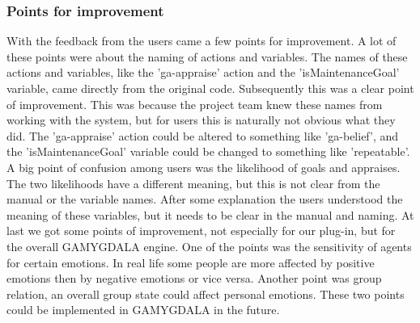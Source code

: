 \subsubsection{Points for improvement}
With the feedback from the users came a few points for improvement. A lot of these points were about the naming of actions and variables. The names of these actions and variables, like the 'ga-appraise' action and the 'isMaintenanceGoal' variable, came directly from the original code. Subsequently this was a clear point of improvement. This was because the project team knew these names from working with the system, but for users this is naturally not obvious what they did. The 'ga-appraise' action could be altered to something like 'ga-belief', and the 'isMaintenanceGoal' variable could be changed to something like 'repeatable'. A big point of confusion among users was the likelihood of goals and appraises. The two likelihoods have a different meaning, but this is not clear from the manual or the variable names. After some explanation the users understood the meaning of these variables, but it needs to be clear in the manual and naming. At last we got some points of improvement, not especially for our plug-in, but for the overall GAMYGDALA engine. One of the points was the sensitivity of agents for certain emotions. In real life some people are more affected by positive emotions then by negative emotions or vice versa. Another point was group relation, an overall group state could affect personal emotions. These two points could be implemented in GAMYGDALA in the future.